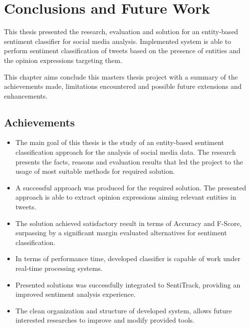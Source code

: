 \chapter{Conclusions and Future Work}
\label{sec:conc} 

This thesis presented the research, evaluation and solution for an entity-based sentiment classifier for social media analysis. Implemented system is able to perform sentiment classification of tweets based on the presence of entities and the opinion expressions targeting them. 

This chapter aims conclude this masters thesis project with a summary of the achievements made, limitations encountered and possible future extensions and enhancements. 



\section{Achievements}

\begin{itemize} 
\itemsep0em  

\item The main goal of this thesis is the study of an entity-based sentiment classification approach for the analysis of social media data. The research presents the facts, reasons and evaluation results that led the project to the usage of most suitable methods for required solution.

\item A successful approach was produced for the required solution. The presented approach is able to extract opinion expressions aiming relevant entities in tweets.

\item The solution achieved satisfactory result in terms of Accuracy and F-Score, surpassing by a significant margin evaluated alternatives for sentiment classification.

\item In terms of performance time, developed classifier is capable of work under real-time processing systems.

\item Presented solutions was successfully integrated to SentiTrack, providing an improved sentiment analysis experience.

\item The clean organization and structure of developed system, allows future interested researches to improve and modify provided tools.



\end{itemize}

